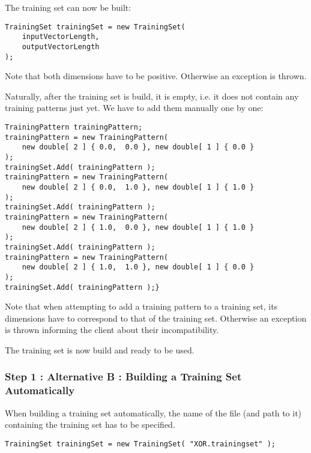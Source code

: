 \medskip

The training set can now be built:

\medskip

\begin{verbatim}
TrainingSet trainingSet = new TrainingSet(
    inputVectorLength,
    outputVectorLength
);
\end{verbatim}

\medskip

Note that both dimensions have to be positive. Otherwise an exception is thrown.

Naturally, after the training set is build, it is empty, i.e. it does not contain any training patterns just yet. We have to add them manually one by one:

\medskip

\begin{verbatim}
TrainingPattern trainingPattern;
trainingPattern = new TrainingPattern(
    new double[ 2 ] { 0.0,  0.0 }, new double[ 1 ] { 0.0 }
);
trainingSet.Add( trainingPattern );
trainingPattern = new TrainingPattern(
    new double[ 2 ] { 0.0,  1.0 }, new double[ 1 ] { 1.0 }
);
trainingSet.Add( trainingPattern );
trainingPattern = new TrainingPattern(
    new double[ 2 ] { 1.0,  0.0 }, new double[ 1 ] { 1.0 }
);
trainingSet.Add( trainingPattern );
trainingPattern = new TrainingPattern(
    new double[ 2 ] { 1.0,  1.0 }, new double[ 1 ] { 0.0 }
);
trainingSet.Add( trainingPattern );}
\end{verbatim}

\medskip

Note that when attempting to add a training pattern to a training set, its dimensions have to correspond to that of the training set. Otherwise an exception is thrown informing the client about their incompatibility.
  
The training set is now build and ready to be used.

\subsubsection{Step 1 : Alternative B : Building a Training Set Automatically}

When building a training set automatically, the name of the file (and path to it) containing the training set has to be specified.

\medskip

\begin{verbatim}
TrainingSet trainingSet = new TrainingSet( "XOR.trainingset" );
\end{verbatim}

